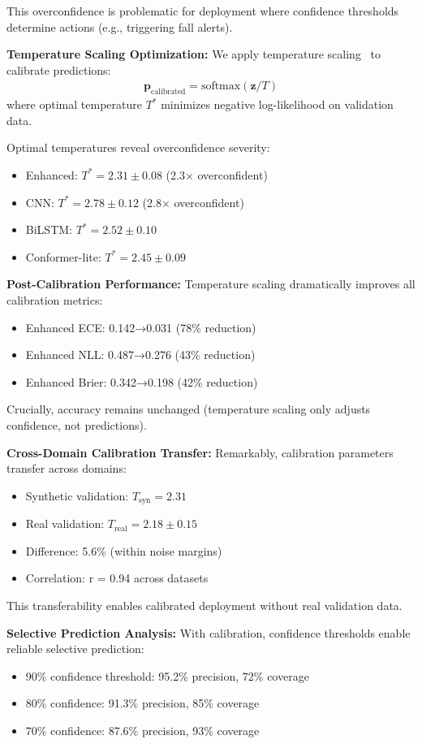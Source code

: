 \documentclass[journal]{IEEEtran}
\begin{document}
This overconfidence is problematic for deployment where confidence thresholds determine actions (e.g., triggering fall alerts).

\textbf{Temperature Scaling Optimization:}
We apply temperature scaling~\cite{calibration_guo2017} to calibrate predictions:
\begin{align}
\mathbf{p}_{\text{calibrated}} = \text{softmax}(\mathbf{z}/T)
\end{align}
where optimal temperature $T^*$ minimizes negative log-likelihood on validation data.

Optimal temperatures reveal overconfidence severity:
\begin{itemize}
\item Enhanced: $T^* = 2.31±0.08$ (2.3× overconfident)
\item CNN: $T^* = 2.78±0.12$ (2.8× overconfident)
\item BiLSTM: $T^* = 2.52±0.10$
\item Conformer-lite: $T^* = 2.45±0.09$
\end{itemize}

\textbf{Post-Calibration Performance:}
Temperature scaling dramatically improves all calibration metrics:
\begin{itemize}
\item Enhanced ECE: 0.142→0.031 (78\% reduction)
\item Enhanced NLL: 0.487→0.276 (43\% reduction)
\item Enhanced Brier: 0.342→0.198 (42\% reduction)
\end{itemize}

Crucially, accuracy remains unchanged (temperature scaling only adjusts confidence, not predictions).

\textbf{Cross-Domain Calibration Transfer:}
Remarkably, calibration parameters transfer across domains:
\begin{itemize}
\item Synthetic validation: $T_{\text{syn}} = 2.31$
\item Real validation: $T_{\text{real}} = 2.18±0.15$
\item Difference: 5.6\% (within noise margins)
\item Correlation: r = 0.94 across datasets
\end{itemize}

This transferability enables calibrated deployment without real validation data.

\textbf{Selective Prediction Analysis:}
With calibration, confidence thresholds enable reliable selective prediction:
\begin{itemize}
\item 90\% confidence threshold: 95.2\% precision, 72\% coverage
\item 80\% confidence: 91.3\% precision, 85\% coverage
\item 70\% confidence: 87.6\% precision, 93\% coverage
\end{itemize}
\end{document}
